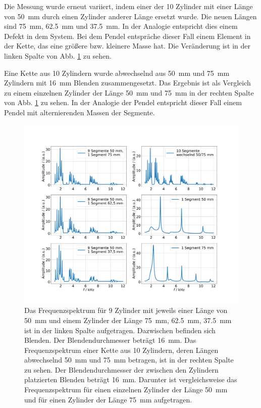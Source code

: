 Die Messung wurde erneut variiert, indem einer der \num{10} Zylinder mit einer Länge von \SI{50}{\milli\meter} durch einen Zylinder anderer Länge ersetzt wurde. Die neuen Längen sind \SI{75}{\milli\meter}, \SI{62.5}{\milli\meter} und \SI{37.5}{\milli\meter}. In der Analogie entspricht dies einem Defekt in dem System. Bei dem Pendel entspräche dieser Fall einem Element in der Kette, das eine größere bzw. kleinere Masse hat. 
Die Veränderung ist in der linken Spalte von Abb. \ref{fig:var4} zu sehen.

Eine Kette aus 10 Zylindern wurde abwechselnd aus \SI{50}{\milli\meter} und \SI{75}{\milli\meter} Zylindern mit \SI{16}{\milli\meter} Blenden zusammengesetzt.
Das Ergebnis ist als Vergleich zu einem einzelnen Zylinder der Länge \SI{50}{\milli\metre} und \SI{75}{\milli\metre} in der rechten Spalte von Abb. \ref{fig:var4} zu sehen. In der Analogie der Pendel entspricht dieser Fall einem Pendel mit alternierenden Massen der Segmente.
 
\begin{figure}
    \centering
    \includegraphics[width=\textwidth]{plots/B_5.pdf}
    \caption{Das Frequenzspektrum für 9 Zylinder mit jeweils einer Länge von \SI{50}{\milli\metre} und einem Zylinder der Länge \SI{75}{\milli\metre}, \SI{62.5}{\milli\metre}, \SI{37.5}{\milli\metre} ist in der linken Spalte aufgetragen. Dazwischen befinden sich Blenden. Der Blendendurchmesser beträgt \SI{16}{\milli\metre}. 
    Das Frequenzspektrum einer Kette aus 10 Zylindern, deren Längen abwechselnd \SI{50}{\milli\metre} und \SI{75}{\milli\metre} betragen, ist in der rechten Spalte zu sehen. Der Blendendurchmesser der zwischen den Zylindern platzierten Blenden beträgt \SI{16}{\milli\metre}. Darunter ist vergleichsweise das Frequenzspektrum für einen einzelnen Zylinder der Länge \SI{50}{\milli\metre} und für einen Zylinder der Länge \SI{75}{\milli\metre} aufgetragen.}
    \label{fig:var4}
\end{figure}

